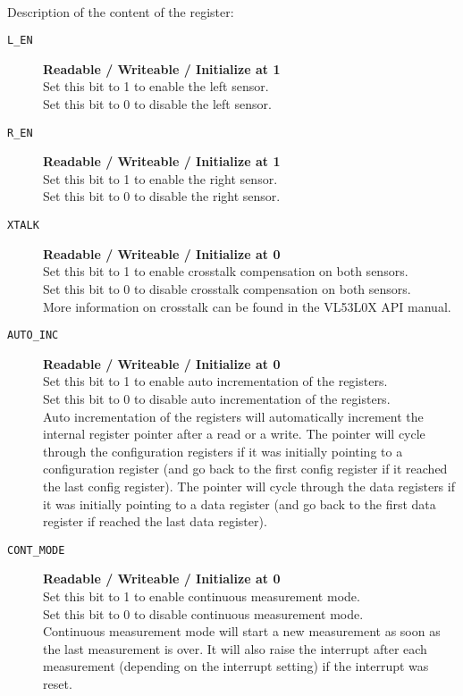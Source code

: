 \paragraph{} Description of the content of the register:
\begin{description}
 \item[\texttt{L\_EN}] \qquad \textbf{Readable / Writeable / Initialize at 1}\\
       Set this bit to 1 to enable the left sensor.\\
       Set this bit to 0 to disable the left sensor.

 \item[\texttt{R\_EN}] \qquad \textbf{Readable / Writeable / Initialize at 1}\\
       Set this bit to 1 to enable the right sensor.\\
       Set this bit to 0 to disable the right sensor.

 \item[\texttt{XTALK}] \qquad \textbf{Readable / Writeable / Initialize at 0}\\
       Set this bit to 1 to enable crosstalk compensation on both sensors.\\
       Set this bit to 0 to disable crosstalk compensation on both sensors.\\
       More information on crosstalk can be found in the VL53L0X API manual.

 \item[\texttt{AUTO\_INC}] \qquad \textbf{Readable / Writeable / Initialize at 0}\\
       Set this bit to 1 to enable \iic auto incrementation of the registers.\\
       Set this bit to 0 to disable \iic auto incrementation of the registers.\\
       Auto incrementation of the registers will automatically increment the internal register pointer after a read or a write. The pointer will cycle through the configuration registers if it was initially pointing to a configuration register (and go back to the first config register if it reached the last config register). The pointer will cycle through the data registers if it was initially pointing to a data register (and go back to the first data register if reached the last data register).

 \item[\texttt{CONT\_MODE}] \qquad \textbf{Readable / Writeable / Initialize at 0}\\
       Set this bit to 1 to enable continuous measurement mode.\\
       Set this bit to 0 to disable continuous measurement mode.\\
       Continuous measurement mode will start a new measurement as soon as the last measurement is over. It will also raise the interrupt after each measurement (depending on the interrupt setting) if the interrupt was reset.


\end{description}

